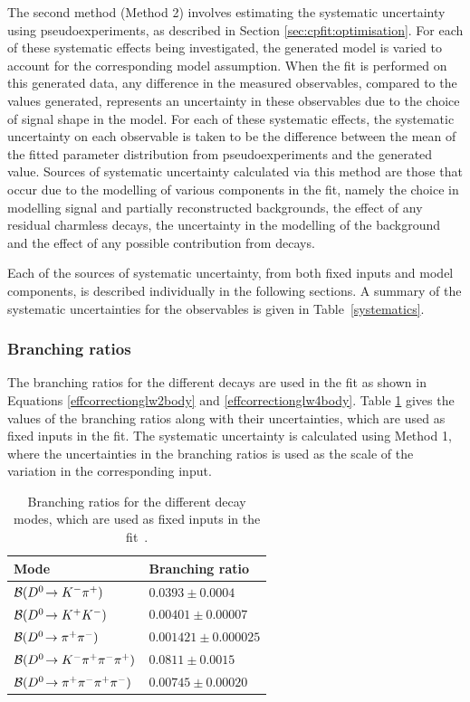 The second method (Method 2) involves estimating the systematic uncertainty using pseudoexperiments, as described in Section \ref{sec:cpfit:optimisation}. For each of these systematic effects being investigated, the generated model is varied to account for the corresponding model assumption. When the fit is performed on this generated data, any difference in the measured \CP observables, compared to the values generated, represents an uncertainty in these observables due to the choice of signal shape in the model. For each of these systematic effects, the systematic uncertainty on each observable is taken to be the difference between the mean of the fitted parameter distribution from pseudoexperiments and the generated value. Sources of systematic uncertainty calculated via this method are those that occur due to the modelling of various components in the \CP fit, namely the choice in modelling signal and partially reconstructed backgrounds, the effect of any residual charmless \B decays, the uncertainty in the modelling of the  background and the effect of any possible contribution from  decays.

Each of the sources of systematic uncertainty, from both fixed inputs and model components, is described individually in the following sections. A summary of the systematic uncertainties for the \CP observables is given in Table~\ref{systematics}.

\subsubsection{Branching ratios}

The branching ratios for the different \Dz decays are used in the \CP fit as shown in Equations \ref{effcorrectionglw2body} and \ref{effcorrectionglw4body}. Table \ref{BR} gives the values of the branching ratios along with their uncertainties, which are used as fixed inputs in the \CP fit. The systematic uncertainty is calculated using Method 1, where the uncertainties in the branching ratios is used as the scale of the variation in the corresponding input.

\begin{table}
\centering
\begin{tabular}{l|l}
\hline
Mode & Branching ratio \\
\hline
$\mathcal{B}({{D}^0}\!\rightarrow {\ensuremath{{K}^-}}{\ensuremath{{\pi}^+}})$ & $0.0393 \pm 0.0004$ \\
$\mathcal{B}({{D}^0}\!\rightarrow {\ensuremath{{K}^+}}{\ensuremath{{K}^-}})$ & $0.00401 \pm 0.00007$ \\
$\mathcal{B}({{D}^0}\!\rightarrow {\ensuremath{{\pi}^+}}{\ensuremath{{\pi}^-}})$ & $0.001421 \pm 0.000025$ \\
$\mathcal{B}({{D}^0}\!\rightarrow {\ensuremath{{K}^-}}{\ensuremath{{\pi}^+}}{\ensuremath{{\pi}^-}}{\ensuremath{{\pi}^+}})$ & $0.0811 \pm 0.0015$ \\
$\mathcal{B}({{D}^0}\!\rightarrow {\ensuremath{{\pi}^+}}{\ensuremath{{\pi}^-}}{\ensuremath{{\pi}^+}}{\ensuremath{{\pi}^-}})$ & $0.00745 \pm 0.00020$ \\
\hline
\end{tabular}
\caption{Branching ratios for the different \Dz decay modes, which are used as fixed inputs in the \CP fit~\cite{PDG2014}.}
\label{BR}
\end{table}


